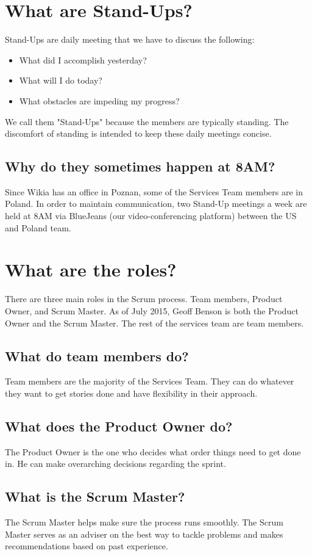 \documentclass[oneside]{book}
\begin{document}
\section{What are Stand-Ups?}
Stand-Ups are daily meeting that we have to discuss the following:
\begin{itemize}
	\item What did I accomplish yesterday?
	\item What will I do today?
	\item What obstacles are impeding my progress?
\end{itemize}
We call them "Stand-Ups" because the members are typically standing. The discomfort of standing is intended to keep these daily meetings concise.
\subsection{Why do they sometimes happen at 8AM?}
Since Wikia has an office in Poznan, some of the Services Team members are in Poland. In order to maintain communication, two Stand-Up meetings a week are held at 8AM via BlueJeans (our video-conferencing platform) between the US and Poland team.
\section{What are the roles?}
There are three main roles in the Scrum process. Team members, Product Owner, and Scrum Master. As of July 2015, Geoff Benson is both the Product Owner and the Scrum Master. The rest of the services team are team members.
\subsection{What do team members do?}
Team members are the majority of the Services Team. They can do whatever they want to get stories done and have flexibility in their approach.
\subsection{What does the Product Owner do?}
The Product Owner is the one who decides what order things need to get done in. He can make overarching decisions regarding the sprint. 
\subsection{What is the Scrum Master?}
The Scrum Master helps make sure the process runs smoothly. The Scrum Master serves as an adviser on the best way to tackle problems and makes recommendations based on past experience. 
\end{document}
